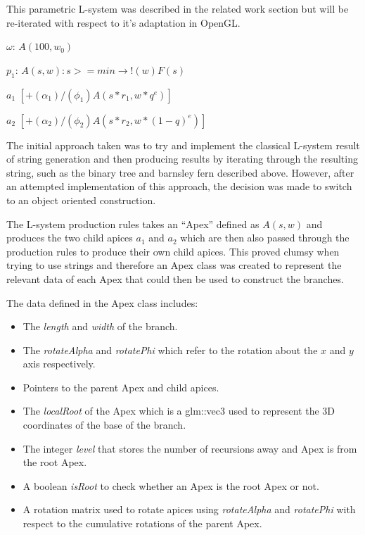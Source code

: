 \documentclass[final]{cmpreport}
\begin{document}
This parametric L-system was described in the related work section but will be re-iterated with 
respect to it's adaptation in OpenGL.

$\omega$: $A(100, w_0)$ 

\indent $p_1$: $A(s, w) : s >= min \rightarrow !(w)F(s)$

\indent $a_1$ $[+(\alpha_1)/(\phi_1)A(s * r_1, w * q ^ e)]$

\indent $a_2$ $[+(\alpha_2)/(\phi_2)A(s * r_2, w * (1 - q) ^ e)]$

The initial approach taken was to try and implement the classical L-system result of string 
generation and then producing results by iterating through the resulting string, such as the 
binary tree and barnsley fern described above. However, after an attempted implementation of 
this approach, the decision was made to switch to an object oriented construction.

The L-system production rules takes an ``Apex'' defined as $A(s, w)$ and produces the two child 
apices $a_1$ and $a_2$ which are then also passed through the production rules to produce their 
own child apices. This proved clumsy when trying to use strings and therefore an Apex class was 
created to represent the relevant data of each Apex that could then be used to construct the 
branches. 

The data defined in the Apex class includes: 
\begin{itemize}
    \item The \emph{length} and \emph{width} of the branch.
    \item The \emph{rotateAlpha} and \emph{rotatePhi} which refer to the rotation about the $x$ and $y$ axis 
          respectively.
    \item Pointers to the parent Apex and child apices.
    \item The \emph{localRoot} of the Apex which is a glm::vec3 used to represent the 3D coordinates 
          of the base of the branch.
    \item The integer \emph{level} that stores the number of recursions away and Apex is from the root Apex.
    \item A boolean \emph{isRoot} to check whether an Apex is the root Apex or not.
    \item A rotation matrix used to rotate apices using \emph{rotateAlpha} and \emph{rotatePhi} with 
          respect to the cumulative rotations of the parent Apex.
\end{itemize}
\end{document}
